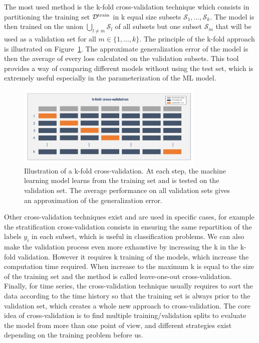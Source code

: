 \documentclass[main]{subfiles}
\begin{document}
The most used method is the k-fold cross-validation technique which consists in partitioning the training set $\mathcal{D}^{\text{train}}$ in k equal size subsets $\mathcal{S}_1,...,\mathcal{S}_k$. The model is then trained on the union $\bigcup_{l\neq m} \mathcal{S}_l$ of all subsets but one subset $\mathcal{S}_m$ that will be used as a validation set for all $m\in \{1,\ldots,k\}$. The principle of the k-fold approach is illustrated on Figure~\ref{fgr:kfold}. The approximate generalization error of the model is then the average of every loss calculated on the validation subsets. This tool provides a way of comparing different models without using the test set, which is extremely useful especially in the parameterization of the ML model.

\begin{figure}[ht]
  \centering
    \includegraphics[width=0.8\textwidth]{figures/4-ml/cross-validation.pdf}
    \caption{Illustration of a k-fold cross-validation. At each step, the machine learning model learns from the training set and is tested on the validation set. The average performance on all validation sets gives an approximation of the generalization error.}\label{fgr:kfold}
\end{figure}

Other cross-validation techniques exist and are used in specific cases, for example the stratification cross-validation consists in ensuring the same repartition of the labels $y_i$ in each subset, which is useful in classification problems. We can also make the validation process even more exhaustive by increasing the k in the k-fold validation. However it requires k training of the models, which increase the computation time required. When increase to the maximum k is equal to the size of the training set and the method is called leave-one-out cross-validation. Finally, for time series, the cross-validation technique usually requires to sort the data according to the time history so that the training set is always prior to the validation set, which creates a whole new approach to cross-validation. The core idea of cross-validation is to find multiple training/validation splits to evaluate the model from more than one point of view, and different strategies exist depending on the training problem before us.
\end{document}
